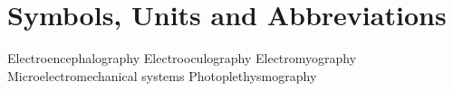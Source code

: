 \chapter*{Symbols, Units and Abbreviations}

\begin{acronym}
   {Electroencephalography}
   {Electrooculography}
   {Electromyography}
   {Microelectromechanical systems}
   {Photoplethysmography}
\end{acronym}

\newpage